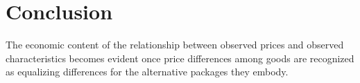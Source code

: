 \documentclass[11pt]{article}
\begin{document}
\section{Conclusion}
The economic content of the relationship between observed prices and observed characteristics becomes evident once price differences among goods are recognized as equalizing differences for the alternative packages they embody.




 
\end{document}
